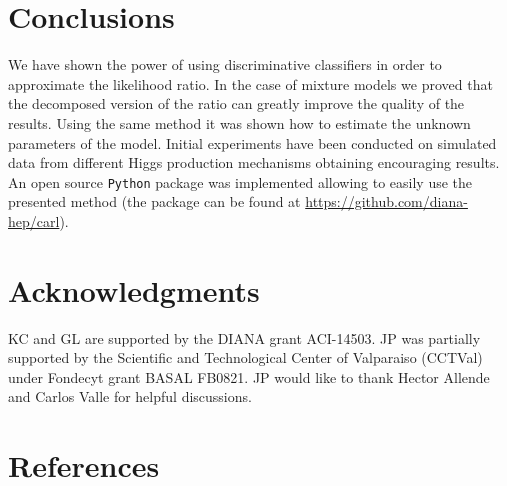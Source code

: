 \documentclass[a4paper]{jpconf}
\begin{document}



\section{Conclusions}
We have shown the power of using discriminative classifiers in order to approximate the likelihood ratio. In the case of mixture models we proved that the decomposed version of the ratio can greatly improve the quality of the results. Using the same method it was shown how to estimate the unknown parameters of the model. Initial experiments have been conducted on simulated data from different Higgs production mechanisms obtaining encouraging results. An open source \texttt{Python} package was implemented allowing to easily use the presented method (the package can be found at \url{https://github.com/diana-hep/carl}).
\section{Acknowledgments}
KC and GL are supported by the DIANA grant ACI-14503. JP was partially supported by the Scientific and Technological Center of Valparaiso (CCTVal) under Fondecyt grant BASAL FB0821. JP would like to thank Hector Allende and Carlos Valle for helpful discussions.


\section*{References}

\end{document}
